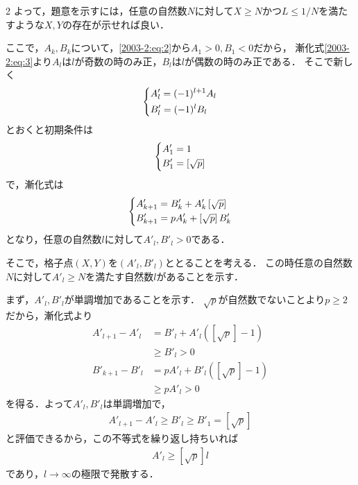 \documentclass[../../../../main.tex]{subfiles}
\begin{document}
\begin{multicols}{2}
  よって，題意を示すには，任意の自然数$N$に対して$X \ge N$かつ$L \le 1/N$を満たすような$X,Y$の存在が示せれば良い．

  ここで，$A_{k},B_{k}$について，\cref{2003-2:eq:2}から$A_1>0, B_1<0$だから，
  漸化式\cref{2003-2:eq:3}より$A_{l}$は$l$が奇数の時のみ正，$B_{l}$は$l$が偶数の時のみ正である．
  そこで新しく
  \begin{align*}
    \begin{dcases}
      A'_{l} = (-1)^{l+1}A_{l} \\
      B'_{l} = (-1)^{l}B_{l}
    \end{dcases}
  \end{align*}
  とおくと初期条件は
  \begin{align}
    \begin{dcases}
      A'_1 = 1 \\
      B'_1 = \left[\sqrt{p}\right]
    \end{dcases}\label{2003-2:eq:5}
  \end{align}
  で，漸化式は
  \begin{align}
    \begin{dcases}
      A'_{k+1} = B'_{k}+A'_{k}\left[\sqrt{p}\right] \\
      B'_{k+1} = pA'_k+\left[\sqrt{p}\right]B'_{k}
    \end{dcases} \label{2003-2:eq:8}
  \end{align}
  となり，任意の自然数$l$に対して$A'_{l},B'_{l}>0$である．

  そこで，格子点$(X,Y)$を$(A'_{l},B'_{l})$ととることを考える．
  この時任意の自然数$N$に対して$A'_{l} \ge N$を満たす自然数$l$があることを示す．

  まず，$A'_{l},B'_{l}$が単調増加であることを示す．
  $\sqrt{p}$が自然数でないことより$p \ge 2$だから，漸化式より
  \begin{align*}
    A'_{l+1} - A'_{l}
     & = B'_{l}+A'_{l}\left(\left[\sqrt{p}\right]-1\right)  \\
     & \ge B'_{l} > 0                                       \\
    B'_{k+1} - B'_{l}
     & = pA'_{l}+B'_{l}\left(\left[\sqrt{p}\right]-1\right) \\
     & \ge pA'_{l} > 0
  \end{align*}
  を得る．よって$A'_{l},B'_{l}$は単調増加で，
  \begin{align*}
    A'_{l+1} - A'_{l} \ge B'_{l} \ge B'_{1} = \left[\sqrt{p}\right]
  \end{align*}
  と評価できるから，この不等式を繰り返し持ちいれば
  \begin{align*}
    A'_{l} \ge \left[\sqrt{p}\right] l
  \end{align*}
  であり，$l\to\infty$の極限で発散する．


\end{multicols}
\end{document}
